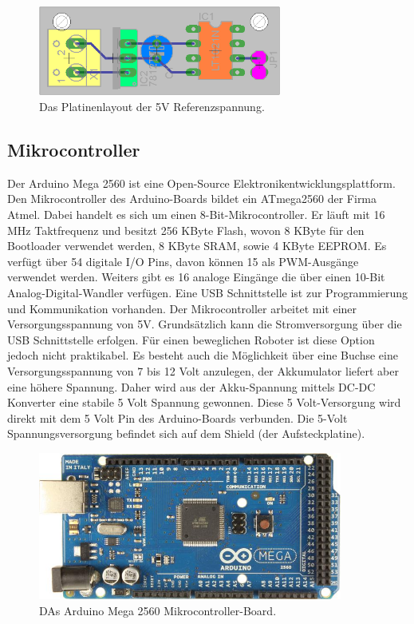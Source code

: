 \documentclass[a4paper,bibtotoc,oneside]{scrbook}
\begin{document}
\begin{figure}[htbp]
\centering
\includegraphics[width=80mm]{img/refu2.png}
\caption{Das Platinenlayout der 5V Referenzspannung.}\label{refu2}
\end{figure}

 
\subsection{Mikrocontroller}\thispagestyle{empty}
Der Arduino Mega 2560 ist eine Open-Source Elektronikentwicklungsplattform. Den Mikrocontroller des Arduino-Boards bildet ein ATmega2560 der Firma Atmel. Dabei handelt es sich um einen 8-Bit-Mikrocontroller.  Er läuft mit 16 MHz Taktfrequenz und besitzt 256 KByte Flash, wovon 8 KByte für den Bootloader verwendet werden, 8 KByte SRAM, sowie 4 KByte EEPROM.  Es verfügt über 54 digitale I/O Pins, davon können 15 als PWM-Ausgänge verwendet werden. Weiters gibt es 16 analoge Eingänge die über einen 10-Bit Analog-Digital-Wandler verfügen.
Eine USB Schnittstelle ist zur Programmierung und Kommunikation vorhanden.
Der Mikrocontroller arbeitet mit einer Versorgungsspannung von 5V.
Grundsätzlich kann die Stromversorgung über die USB Schnittstelle erfolgen. Für einen beweglichen Roboter ist diese Option jedoch nicht praktikabel. Es besteht auch die Möglichkeit über eine Buchse eine Versorgungsspannung von 7 bis 12 Volt anzulegen, der Akkumulator liefert aber eine höhere Spannung. 
Daher wird aus der Akku-Spannung mittels DC-DC Konverter eine stabile 5 Volt Spannung gewonnen. Diese 5 Volt-Versorgung wird direkt mit dem 5 Volt Pin des Arduino-Boards verbunden. Die 5-Volt Spannungsversorgung befindet sich auf dem Shield (der Aufsteckplatine).

\begin{figure}[htbp]
\centering
\includegraphics[width=100mm]{img/ArduinoMega2.jpg}
\caption[Arduino Mega 2560]{DAs Arduino Mega 2560 Mikrocontroller-Board.}\label{ardu}
\end{figure}
\end{document}

